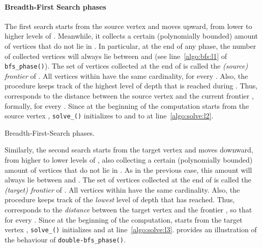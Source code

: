 \paragraph{Breadth-First Search phases}
The first search  starts from the source vertex  and moves upward,
from lower to higher levels of .
Meanwhile, it collects a certain (polynomially bounded) amount of vertices that do not lie in .
In particular, at the end of any  phase,
the number of collected vertices will always
lie between  and 
(see line~\ref{algo:bfs:l1} of \texttt{bfs\_phase()}).
The set  of vertices collected at the end of  is called the \emph{(source) frontier} of .
All vertices within  have the same cardinality, \ie  for every .
Also, the procedure keeps track of the highest level of depth  that is reached during .
Thus,  corresponds to the distance between the source vertex  and
the current frontier ,
formally,  for every .
Since at the beginning of the computation  starts from the source vertex ,
\texttt{solve\_\mainproblem()} initializes  to  and  to  at line~\ref{algo:solve:l2}.

\begin{algorithm}[t]
\caption{Breadth-First-Search phases.}\label{ALGO:double_bfs}
\DontPrintSemicolon
{}
\footnotesize
\nonl{}

\nonl{}

\setcounter{AlgoLine}{0}

\nonl{}
\end{algorithm}

Similarly, the second search  starts from the target vertex  and moves downward,
from higher to lower levels of , also collecting a certain (polynomially bounded) amount of vertices that do not lie in .
As in the previous case, this amount will always
lie between  and .
The set  of vertices collected at the end of 
is called the \emph{(target) frontier} of .
All vertices within  have the same cardinality.
Also, the procedure keeps track of the \emph{lowest} level of depth  that  has reached.
Thus,  corresponds to the \emph{distance} between the target vertex  and the frontier ,
so that  for every . Since at the beginning of the computation,
 starts from the target vertex ,
\texttt{solve\_\mainproblem()} initializes  and  at line~\ref{algo:solve:l3}.
 provides an illustration of the behaviour of \texttt{double-bfs\_phase()}.

